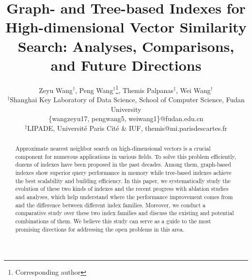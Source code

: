 \documentclass[11pt]{article}
\begin{document}
 


\title{Graph- and Tree-based Indexes for High-dimensional Vector Similarity Search: Analyses, Comparisons, and Future Directions}



\author{Zeyu Wang$^{\dagger}$, Peng Wang$^{\dagger}$\thanks{Corresponding author},  Themis Palpanas$^{\ddagger}$, Wei Wang$^{\dagger}$\\
$^{\dagger}$Shanghai Key Laboratory of Data Science, School of Computer Science, Fudan University\\
  \{wangzeyu17, pengwang5, weiwang1\}@fudan.edu.cn\\
  $^{\ddagger}$LIPADE, Universit{\'e} Paris Cit{\'e} \& IUF, themis@mi.parisdescartes.fr}

\setcounter{section}{0}
\setcounter{figure}{0}
\setcounter{table}{0}




\maketitle

\renewcommand\thesection{\arabic{section}}
\setcounter{section}{0}
\setcounter{figure}{0}
\setcounter{table}{0}

\begin{abstract}
Approximate nearest neighbor search on high-dimensional vectors is a crucial component for numerous applications in various fields.
To solve this problem efficiently, dozens of indexes have been proposed in the past decades.
Among them, graph-based indexes show superior query performance in memory while tree-based indexes achieve the best scalability and building efficiency.
In this paper, we systematically study the evolution of these two kinds of indexes and the recent progress with ablation studies and analyses, which help understand where the performance improvement comes from and the difference between different index families.
Moreover, we conduct a comparative study over these two index families and discuss the existing and potential combinations of them.
We believe this study can serve as a guide to the most promising directions for addressing the open problems in this area.
\end{abstract}
\end{document}
